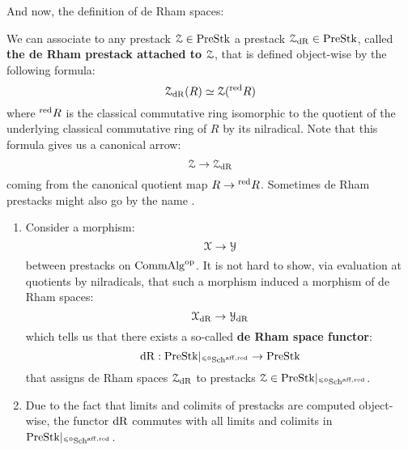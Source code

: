                 And now, the definition of de Rham spaces:
                \begin{definition} \label{def: de_rham_prestacks}
                    We can associate to any prestack $\mathcal{Z} \in \mathrm{Pre}\mathrm{Stk}$ a prestack $\mathcal{Z}_{\mathrm{dR}} \in \mathrm{Pre}\mathrm{Stk}$, called \textbf{the de Rham prestack attached to $\mathcal{Z}$}, that is defined object-wise by the following formula:
                        $$\mathcal{Z}_{\mathrm{dR}}(R) \simeq \mathcal{Z}({}^{\mathrm{red}}R)$$
                    where ${}^{\mathrm{red}}R$ is the classical commutative ring isomorphic to the quotient of the underlying classical commutative ring of $R$ by its nilradical. Note that this formula gives us a canonical arrow:
                        $$\mathcal{Z} \to \mathcal{Z}_{\mathrm{dR}}$$
                    coming from the canonical quotient map $R \to {}^{\mathrm{red}}R$. Sometimes de Rham prestacks might also go by the name .
                \end{definition}
                \begin{remark} \label{remark: de_rham_prestacks_functoriality}
                    \noindent
                    \begin{enumerate}
                        \item Consider a morphism:
                            $$\mathcal{X} \to \mathcal{Y}$$
                        between prestacks on $\mathrm{Comm}\mathrm{Alg}^{\mathrm{op}}$. It is not hard to show, via evaluation at quotients by nilradicals, that such a morphism induced a morphism of de Rham spaces:
                            $$\mathcal{X}_{\mathrm{dR}} \to \mathcal{Y}_{\mathrm{dR}}$$
                        which tells us that there exists a so-called \textbf{de Rham space functor}:
                            $$\mathrm{dR}: \mathrm{Pre}\mathrm{Stk}|_{{}^{\leqslant 0}\mathrm{Sch}^{\mathrm{aff}, \mathrm{red}}} \to \mathrm{Pre}\mathrm{Stk}$$
                        that assigns de Rham spaces $\mathcal{Z}_{\mathrm{dR}}$ to prestacks $\mathcal{Z} \in \mathrm{Pre}\mathrm{Stk}|_{{}^{\leqslant 0}\mathrm{Sch}^{\mathrm{aff}, \mathrm{red}}}$. 
                        \item Due to the fact that limits and colimits of prestacks are computed object-wise, the functor $\mathrm{dR}$ commutes with all limits and colimits in $\mathrm{Pre}\mathrm{Stk}|_{{}^{\leqslant 0}\mathrm{Sch}^{\mathrm{aff}, \mathrm{red}}}$.
                    \end{enumerate}
                \end{remark}
                
